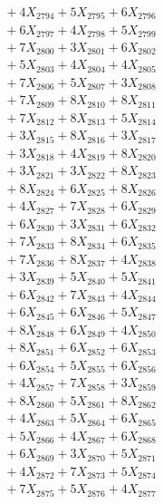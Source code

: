 \documentclass[a4paper,10pt]{article}
\begin{document}
{\begin{align}
&\;  + 4 X_{2794} + 5 X_{2795} + 6 X_{2796} \\[0.3ex]
&\;  + 6 X_{2797} + 4 X_{2798} + 5 X_{2799} \\[0.5ex]\allowbreak
&\;  + 7 X_{2800} + 3 X_{2801} + 6 X_{2802} \\[0.3ex]
&\;  + 5 X_{2803} + 4 X_{2804} + 4 X_{2805} \\[0.3ex]
&\;  + 7 X_{2806} + 5 X_{2807} + 3 X_{2808} \\[0.3ex]
&\;  + 7 X_{2809} + 8 X_{2810} + 8 X_{2811} \\[0.3ex]
&\;  + 7 X_{2812} + 8 X_{2813} + 5 X_{2814} \\[0.3ex]
&\;  + 3 X_{2815} + 8 X_{2816} + 3 X_{2817} \\[0.3ex]
&\;  + 3 X_{2818} + 4 X_{2819} + 8 X_{2820} \\[0.3ex]
&\;  + 3 X_{2821} + 3 X_{2822} + 8 X_{2823} \\[0.3ex]
&\;  + 8 X_{2824} + 6 X_{2825} + 8 X_{2826} \\[0.3ex]
&\;  + 4 X_{2827} + 7 X_{2828} + 6 X_{2829} \\[0.5ex]\allowbreak
&\;  + 6 X_{2830} + 3 X_{2831} + 6 X_{2832} \\[0.3ex]
&\;  + 7 X_{2833} + 8 X_{2834} + 6 X_{2835} \\[0.3ex]
&\;  + 7 X_{2836} + 8 X_{2837} + 4 X_{2838} \\[0.3ex]
&\;  + 3 X_{2839} + 5 X_{2840} + 5 X_{2841} \\[0.3ex]
&\;  + 6 X_{2842} + 7 X_{2843} + 4 X_{2844} \\[0.3ex]
&\;  + 6 X_{2845} + 6 X_{2846} + 5 X_{2847} \\[0.3ex]
&\;  + 8 X_{2848} + 6 X_{2849} + 4 X_{2850} \\[0.3ex]
&\;  + 8 X_{2851} + 6 X_{2852} + 6 X_{2853} \\[0.3ex]
&\;  + 6 X_{2854} + 5 X_{2855} + 6 X_{2856} \\[0.3ex]
&\;  + 4 X_{2857} + 7 X_{2858} + 3 X_{2859} \\[0.5ex]\allowbreak
&\;  + 8 X_{2860} + 5 X_{2861} + 8 X_{2862} \\[0.3ex]
&\;  + 4 X_{2863} + 5 X_{2864} + 6 X_{2865} \\[0.3ex]
&\;  + 5 X_{2866} + 4 X_{2867} + 6 X_{2868} \\[0.3ex]
&\;  + 6 X_{2869} + 3 X_{2870} + 5 X_{2871} \\[0.3ex]
&\;  + 4 X_{2872} + 7 X_{2873} + 5 X_{2874} \\[0.3ex]
&\;  + 7 X_{2875} + 5 X_{2876} + 4 X_{2877} \\[0.3ex]

\end{align}}
\end{document}
